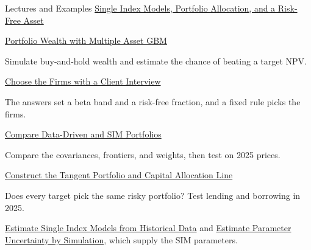 \documentclass[aspectratio=169,11pt]{beamer}
\newcommand{\repo}{https://github.com/varnerlab/CHEME-5660-CourseRepository-Fall-2026/blob/main/lectures/week-6/L6b}
\newcommand{\repoprev}{https://github.com/varnerlab/CHEME-5660-CourseRepository-Fall-2026/blob/main/lectures/week-6/L6a}
\begin{document}
\begin{frame}{Lectures and Examples}
  \textbf{}
  \href{\repo/CHEME-5660-L6b-Lecture-SIM-Portfolio-RF-Fall-2026.ipynb}{Single Index Models, Portfolio Allocation, and a Risk-Free Asset}

  \vspace{0.3em}
  \textbf{}
  \href{\repoprev/CHEME-5660-L6a-Example-MAGBM-Portfolio-Fall-2026.ipynb}{Portfolio Wealth with Multiple Asset GBM}

  Simulate buy-and-hold wealth and estimate the chance of beating a target NPV.

  \vspace{0.3em}
  \textbf{}
  \href{\repo/interview/interview.md}{Choose the Firms with a Client Interview}

  The answers set a beta band and a risk-free fraction, and a fixed rule picks the firms.

  \vspace{0.3em}
  \textbf{}
  \href{\repo/CHEME-5660-L6b-Example-SIM-MinVar-RA-Fall-2026.ipynb}{Compare Data-Driven and SIM Portfolios}

  Compare the covariances, frontiers, and weights, then test on 2025 prices.

  \vspace{0.3em}
  \textbf{}
  \href{\repo/CHEME-5660-L6b-Example-SIM-MinVar-RRFA-Fall-2026.ipynb}{Construct the Tangent Portfolio and Capital Allocation Line}

  Does every target pick the same risky portfolio? Test lending and borrowing in 2025.

  \vspace{0.3em}
  \textbf{}
  \href{\repo/CHEME-5660-L6b-Example-SVD-SIM-Estimation-Fall-2026.ipynb}{Estimate Single Index Models from Historical Data} and
  \href{\repo/CHEME-5660-L6b-Example-SIM-Parameter-Uncertainty-Fall-2026.ipynb}{Estimate Parameter Uncertainty by Simulation},
  which supply the SIM parameters.
\end{frame}
\end{document}
